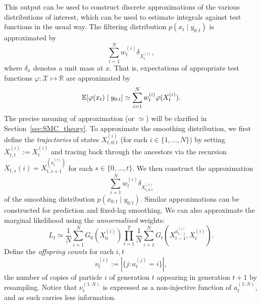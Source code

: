 This output can be used to construct discrete approximations of the various distributions of interest, which can be used to estimate integrals against test functions in the usual way.
The filtering distribution $p(x_t \mid y_{0:t})$ is approximated by
\begin{equation*}
\sum_{i=1}^N w_t^{(i)} \delta_{ X_t^{(i)} } ,
\end{equation*}
where $\delta_x$ denotes a unit mass at $x$.
That is, expectations of appropriate test functions $\varphi : \mathcal{X} \mapsto \mathbb{R}$ are approximated by
\begin{equation*}
\mathbb{E}[ \varphi(x_t) \mid y_{0:t} ]
\simeq \sum_{i=1}^N w_t^{(i)} \varphi( X_t^{(i)} ) .
\end{equation*}
The precise meaning of approximation (or $\simeq$) will be clarified in Section~\ref{sec:SMC_theory}.
To approximate the smoothing distribution, we first define the \emph{trajectories} of states $X_{t,0:t}^{(i)}$ (for each $i \in \{1,\dots,N\}$) by setting $X_{t,t}^{(i)} := X_t^{(i)}$ and tracing back through the ancestors via the recursion $X_{t,s}{(i)} = X_{t,s+1}^{( a_t^{(i)} )}$ for each $s \in \{0,\dots, t\}$. 
We then construct the approximation
\begin{equation*}
\sum_{i=1}^N w_t^{(i)} \delta_{ X_{t,0:t}^{(i)} } 
\end{equation*}
of the smoothing distribution $p(x_{0:t} \mid y_{0:t})$.
Similar approximations can be constructed for prediction and fixed-lag smoothing.
We can also approximate the marginal likelihood using the \emph{unnormalised} weights:
\begin{equation}\label{eq:likelihood_estimate}
L_t 
\simeq \frac{1}{N} \sum_{i=1}^N G_0(X_0^{(i)}) \prod_{t=1}^T \frac{1}{N}
        \sum_{i=1}^N G_t( X_{t-1}^{ a_{t-1}^{(i)} }, X_t^{(i)} ) .
\end{equation}
Define the \emph{offspring counts} for each $i,t$
\begin{equation*}
\nu_t^{(i)} := |\{ j: a_t^{(j)} = i \}| ,
\end{equation*}
the number of copies of particle $i$ of generation $t$ appearing in generation $t+1$ by resampling.
Notice that $\nu_t^{(1:N)}$ is expressed as a non-injective function of $a_t^{(1:N)}$, and as such carries less information.

